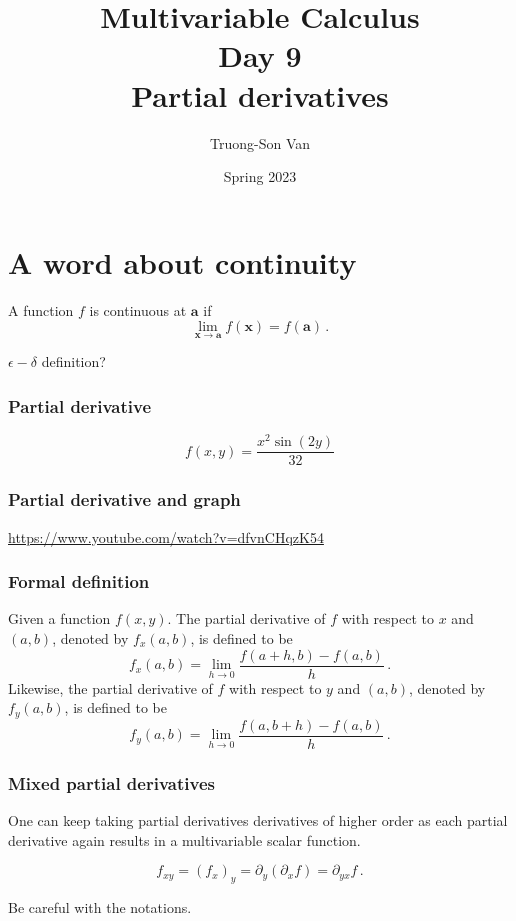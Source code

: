 \documentclass[aspectratio=169,handout]{beamer}
\title{ Multivariable Calculus \\ Day 9\\ Partial derivatives}
\institute{Fulbright University Vietnam}
\author{Truong-Son Van}
\date{Spring 2023}
\newcommand{\vect}{\mathbf}
\begin{document}
\maketitle

\section{A word about continuity}
\begin{frame}
    A function $f$ is continuous at $\vect{a}$ if
    \begin{equation*}
        \lim_{\vect{x} \to \vect{a}} f(\vect{x}) = f(\vect{a}) \,.
    \end{equation*}

    $\epsilon -\delta$ definition?
\end{frame}

\begin{frame}
    \frametitle{Partial derivative}
    \begin{equation*}
        f(x,y) = \frac{x^2 \sin (2y)}{32}
    \end{equation*}
\end{frame}


\begin{frame}
    \frametitle{Partial derivative and graph}
    \url{https://www.youtube.com/watch?v=dfvnCHqzK54}
\end{frame}

\begin{frame}
    \frametitle{Formal definition}
Given a function \(f(x,y)\). The partial derivative of \(f\) with respect to \(x\) and \((a,b)\),
denoted by \(f_x(a,b)\), is defined to be
\begin{equation*}
    f_x(a,b) = \lim_{h\to 0} \frac{ f(a+h,b) - f(a,b)}{h} \,.
\end{equation*}
Likewise, the partial derivative of \(f\) with respect to \(y\) and \((a,b)\),
denoted by \(f_y(a,b)\), is defined to be
\begin{equation*}
    f_y(a,b) = \lim_{h\to 0} \frac{ f(a,b+h) - f(a,b)}{h} \,.
\end{equation*}
\end{frame}

\begin{frame}
    \frametitle{Mixed partial derivatives}
    One can keep taking partial derivatives derivatives of higher order
    as each partial derivative again results in a multivariable scalar function.

    \begin{equation*}
        f_{xy} = (f_x)_y = \partial_y(\partial_x f) = \partial_{yx}f \,.
    \end{equation*}

    Be careful with the notations.
\end{frame}
\end{document}
